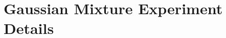 \documentclass{article}
\begin{document}



\section{Gaussian Mixture Experiment Details}\label{app:gaussian}
\end{document}
